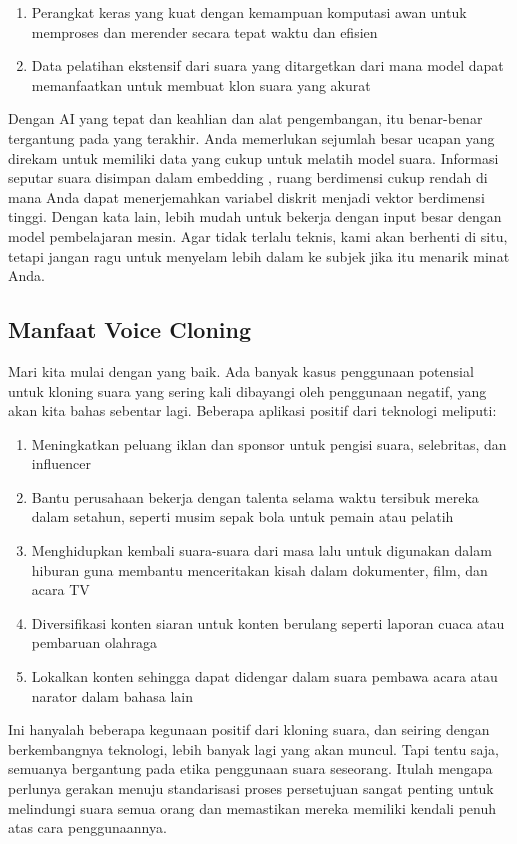 \begin{enumerate}
\item Perangkat keras yang kuat dengan kemampuan komputasi awan untuk memproses dan merender secara tepat waktu dan efisien
\item Data pelatihan ekstensif dari suara yang ditargetkan dari mana model dapat memanfaatkan untuk membuat klon suara yang akurat
\end{enumerate}

Dengan AI yang tepat dan keahlian dan alat pengembangan, itu benar-benar tergantung pada yang terakhir. Anda memerlukan sejumlah besar ucapan yang direkam untuk memiliki data yang cukup untuk melatih model suara. Informasi seputar suara disimpan dalam embedding , ruang berdimensi cukup rendah di mana Anda dapat menerjemahkan variabel diskrit menjadi vektor berdimensi tinggi. Dengan kata lain, lebih mudah untuk bekerja dengan input besar dengan model pembelajaran mesin. Agar tidak terlalu teknis, kami akan berhenti di situ, tetapi jangan ragu untuk menyelam lebih dalam ke subjek jika itu menarik minat Anda.

\subsection{Manfaat Voice Cloning}
Mari kita mulai dengan yang baik. Ada banyak kasus penggunaan potensial untuk kloning suara yang sering kali dibayangi oleh penggunaan negatif, yang akan kita bahas sebentar lagi. Beberapa aplikasi positif dari teknologi meliputi:

\begin{enumerate}
\item Meningkatkan peluang iklan dan sponsor untuk pengisi suara, selebritas, dan influencer
\item Bantu perusahaan bekerja dengan talenta selama waktu tersibuk mereka dalam setahun, seperti musim sepak bola untuk pemain atau pelatih
\item Menghidupkan kembali suara-suara dari masa lalu untuk digunakan dalam hiburan guna membantu menceritakan kisah dalam dokumenter, film, dan acara TV
\item Diversifikasi konten siaran untuk konten berulang seperti laporan cuaca atau pembaruan olahraga
\item Lokalkan konten sehingga dapat didengar dalam suara pembawa acara atau narator dalam bahasa lain
\end{enumerate}

Ini hanyalah beberapa kegunaan positif dari kloning suara, dan seiring dengan berkembangnya teknologi, lebih banyak lagi yang akan muncul. Tapi tentu saja, semuanya bergantung pada etika penggunaan suara seseorang. Itulah mengapa perlunya gerakan menuju standarisasi proses persetujuan sangat penting untuk melindungi suara semua orang dan memastikan mereka memiliki kendali penuh atas cara penggunaannya.


